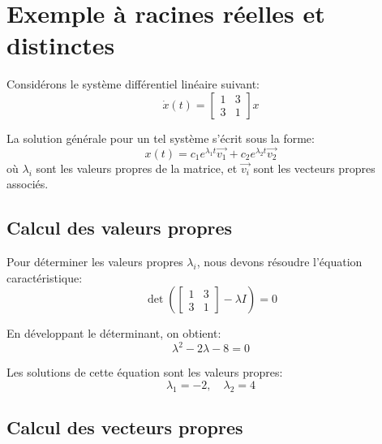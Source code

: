     \section{Exemple à racines réelles et distinctes}
        Considérons le système différentiel linéaire suivant:
        \begin{equation}
            \dot{x}(t)=
            \begin{bmatrix} 1 & 3 \\ 3 & 1 \end{bmatrix} x
        \end{equation}
        
        La solution générale pour un tel système s’écrit sous la forme:
        \begin{equation}
            x(t)=c_1 e^{\lambda_1 t} \overrightarrow{v_1} + c_2 e^{\lambda_2 t} \overrightarrow{v_2}
        \end{equation}
        où $\lambda_i$ sont les valeurs propres de la matrice, et $\overrightarrow{v_i}$ sont les vecteurs propres associés.
        
        \subsection{Calcul des valeurs propres}
            Pour déterminer les valeurs propres $\lambda_i$, nous devons résoudre l’équation caractéristique:
            \begin{equation}
                \det \left( \begin{bmatrix} 1 & 3 \\ 3 & 1 \end{bmatrix} - \lambda I \right)=0
            \end{equation}
            
            En développant le déterminant, on obtient:
            \begin{equation}
                \lambda^2 - 2 \lambda - 8=0
            \end{equation}
            
            Les solutions de cette équation sont les valeurs propres:
            \begin{equation}
                \lambda_1=-2, \quad \lambda_2=4
            \end{equation}
        
        \subsection{Calcul des vecteurs propres}
